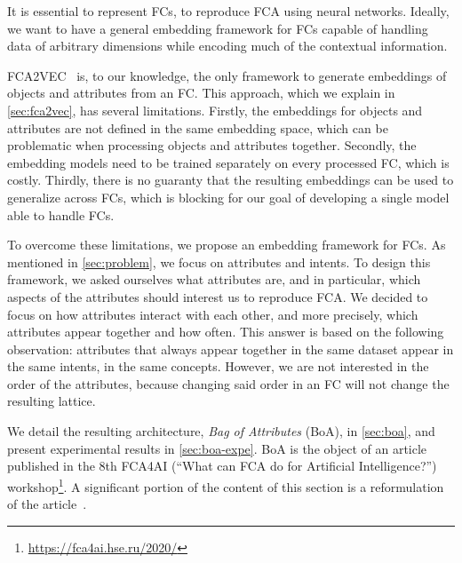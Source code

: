 

It is essential to represent FCs, to reproduce FCA using neural networks.
Ideally, we want to have a general embedding framework for FCs capable of handling data of arbitrary dimensions while encoding much of the contextual information.

FCA2VEC~\cite{fca2vec:2019:durrschnabel} is, to our knowledge, the only framework to generate embeddings of objects and attributes from an FC. This approach, which we explain in \cref{sec:fca2vec}, has several limitations.
Firstly, the embeddings for objects and attributes are not defined in the same embedding space, which can be problematic when processing objects and attributes together. Secondly, the embedding models need to be trained separately on every processed FC, which is costly. Thirdly, there is no guaranty that the resulting embeddings can be used to generalize across FCs, which is blocking for our goal of developing a single model able to handle FCs.

To overcome these limitations, we propose an embedding framework for FCs.
As mentioned in \cref{sec:problem}, we focus on attributes and intents.
To design this framework, we asked ourselves what attributes are, and in particular, which aspects of the attributes should interest us to reproduce FCA.
We decided to focus on how attributes interact with each other, and more precisely, which attributes appear together and how often.
This answer is based on the following observation: attributes that always appear together in the same dataset appear in the same intents, in the same concepts.
However, we are not interested in the order of the attributes, because changing said order in an FC will not change the resulting lattice.

We detail the resulting architecture, \textit{Bag of Attributes} (BoA), in \cref{sec:boa}, and present experimental results in \cref{sec:boa-expe}.
BoA is the object of an article~\cite{boa:2020:marquer} published in the 8th FCA4AI (``What can FCA do for Artificial Intelligence?'') workshop\footnote{\url{https://fca4ai.hse.ru/2020/}}. A significant portion of the content of this section is a reformulation of the article~\cite{boa:2020:marquer}.
